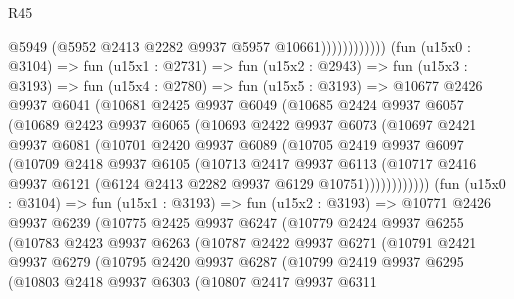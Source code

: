 \begin{lexlean}{R45}
\begin{coremodule}
                              @5949
                              (@5952 @2413 @2282 @9937 @5957 @10661))))))))))))
        (fun (u15x0 : @3104) =>
        fun (u15x1 : @2731) =>
        fun (u15x2 : @2943) =>
        fun (u15x3 : @3193) =>
        fun (u15x4 : @2780) =>
        fun (u15x5 : @3193) =>
        @10677
          @2426
          @9937
          @6041
          (@10681
            @2425
            @9937
            @6049
            (@10685
              @2424
              @9937
              @6057
              (@10689
                @2423
                @9937
                @6065
                (@10693
                  @2422
                  @9937
                  @6073
                  (@10697
                    @2421
                    @9937
                    @6081
                    (@10701
                      @2420
                      @9937
                      @6089
                      (@10705
                        @2419
                        @9937
                        @6097
                        (@10709
                          @2418
                          @9937
                          @6105
                          (@10713
                            @2417
                            @9937
                            @6113
                            (@10717
                              @2416
                              @9937
                              @6121
                              (@6124 @2413 @2282 @9937 @6129 @10751))))))))))))
        (fun (u15x0 : @3104) =>
        fun (u15x1 : @3193) =>
        fun (u15x2 : @3193) =>
        @10771
          @2426
          @9937
          @6239
          (@10775
            @2425
            @9937
            @6247
            (@10779
              @2424
              @9937
              @6255
              (@10783
                @2423
                @9937
                @6263
                (@10787
                  @2422
                  @9937
                  @6271
                  (@10791
                    @2421
                    @9937
                    @6279
                    (@10795
                      @2420
                      @9937
                      @6287
                      (@10799
                        @2419
                        @9937
                        @6295
                        (@10803
                          @2418
                          @9937
                          @6303
                          (@10807
                            @2417
                            @9937
                            @6311

\end{coremodule}
\end{lexlean}
